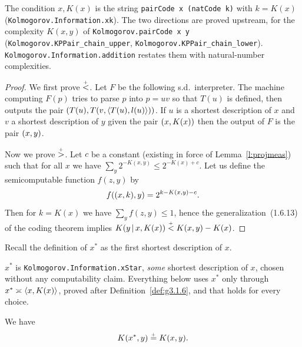 \begin{formalization}
The condition \( x, K(x) \) is the string \texttt{pairCode x (natCode k)} with
\( k = K(x) \) (\texttt{Kolmogorov.Information.xk}). The two directions are proved upstream, for the
complexity \( K(x, y) \) of \texttt{Kolmogorov.pairCode x y}
(\texttt{Kolmogorov.KPPair\_chain\_upper}, \texttt{Kolmogorov.KPPair\_chain\_lower}).
\texttt{Kolmogorov.Information.addition} restates them with natural-number complexities.
\end{formalization}

 \begin{proof}
  \leanok
  We first prove \( \stackrel{{}_+}{<} \).
Let \( F \) be the following s.d.~interpreter.
The machine computing \( F(p) \) tries to parse \( p \) into \( p = uv \) so that
\( T(u) \) is defined, then outputs the pair 
\( ( T(u), T(v,{\mathopen\langle  T(u), l(u) \mathclose\rangle} )) \). 
If \( u \) is a shortest description of \( x \) and \( v \) a
shortest description of \( y \) given the pair \( ( x,K(x)) \) then the
output of \( F \) is the pair \( ( x,y)  \). 

Now we prove \( \stackrel{{}_+}{>} \). 
Let \( c \) be a constant (existing in force of 
Lemma~\ref{l:projmeas}) such that for all \( x \) we have 
\( \sum_y2^{-K(x,y)} \le 2^{-K(x)+c} \). 
Let us define the semicomputable function \( f(z,y) \) by 
 \[	
  f(( x,k) ,y) = 2^{k - K(x,y) - c}.
 \]
  Then for \( k=K(x) \) we have \( \sum_y f(z,y) \le 1 \), hence the
generalization~(1.6.13) of the coding theorem implies
 \(  K(y \,\vert\, x, K(x)) \stackrel{{}_+}{<} K(x,y) - K(x)  \).
 \end{proof}

Recall the definition of \( x^{*} \) as the first shortest description of \( x \).

\begin{formalization}
\( x^{*} \) is \texttt{Kolmogorov.Information.xStar}, \emph{some} shortest description of
\( x \), chosen without any computability claim. Everything below uses \( x^{*} \) only
through \( x^{*} \asymp {\mathopen\langle x, K(x)\mathclose\rangle} \), proved after Definition~\ref{def:g3.1.6}, and that
holds for every choice.
\end{formalization}

 \begin{corollary}
  \label{cor:g3.1.5}
  \leanok
 We have
 \begin{equation}\label{eq:star-joint}
  K(x^{*}, y) \stackrel{{}_+}{=} K(x, y).
 \end{equation}
 \end{corollary}

